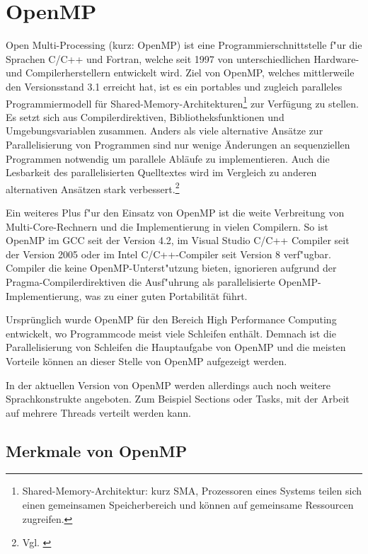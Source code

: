 \documentclass[11pt]{scrartcl}
\begin{document}
\pagebreak

\pagestyle{fancy}
\setcounter{page}{1} 

\section{OpenMP} Open Multi-Processing (kurz: OpenMP) ist eine Programmierschnittstelle
f"ur die Sprachen C/C++ und Fortran, welche seit 1997 von unterschiedlichen Hardware- und Compilerherstellern entwickelt wird. Ziel von OpenMP, welches mittlerweile den Versionsstand 3.1 erreicht hat, ist es ein portables und zugleich paralleles Programmiermodell für Shared-Memory-Architekturen\footnote{Shared-Memory-Architektur: kurz SMA, Prozessoren eines Systems teilen sich einen gemeinsamen Speicherbereich und können auf gemeinsame Ressourcen zugreifen.} zur Verfügung zu stellen. Es setzt sich aus Compilerdirektiven, Bibliotheksfunktionen und Umgebungsvariablen zusammen. Anders als viele alternative Ansätze zur Parallelisierung von Programmen sind nur wenige Änderungen an sequenziellen Programmen notwendig um parallele Abläufe zu implementieren. Auch die Lesbarkeit des parallelisierten Quelltextes wird im Vergleich zu anderen alternativen Ansätzen stark verbessert.\footnote{Vgl. \cite{openmp08} }

Ein weiteres Plus f"ur den Einsatz von OpenMP ist die weite Verbreitung von Multi-Core-Rechnern und die Implementierung in vielen Compilern. So ist OpenMP im GCC seit der Version 4.2, im Visual Studio C/C++ Compiler seit der Version 2005 oder im Intel C/C++-Compiler seit Version 8 verf"ugbar. Compiler die keine OpenMP-Unterst"utzung bieten, ignorieren aufgrund der Pragma-Compilerdirektiven die Ausf"uhrung als parallelisierte OpenMP-Implementierung, was zu einer guten Portabilität führt.

Ursprünglich wurde OpenMP für den Bereich High Performance Computing entwickelt, wo Programmcode meist viele Schleifen enthält. Demnach ist die Parallelisierung von Schleifen die Hauptaufgabe von OpenMP und die meisten Vorteile können an dieser Stelle von OpenMP aufgezeigt werden. 

In der aktuellen Version von OpenMP werden allerdings auch noch weitere Sprachkonstrukte angeboten. Zum Beispiel Sections oder Tasks, mit der Arbeit auf mehrere Threads verteilt werden kann.

\subsection{Merkmale von OpenMP}
\end{document}
